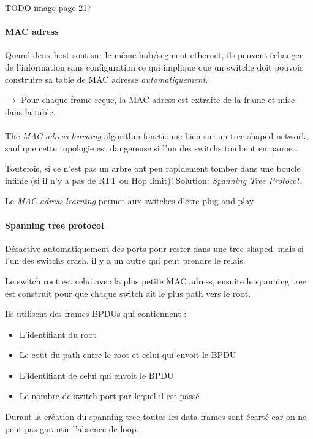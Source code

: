 TODO image page 217

\paragraph{MAC adress}
Quand deux host sont sur le même hub/segment ethernet, ils peuvent échanger de
l'information sans configuration ce qui implique que un switche doit pouvoir
construire sa table de MAC adresse \textit{automatiquement}.

$\rightarrow$ Pour chaque frame reçue, la MAC adress est extraite de la frame et mise dans la table.

\paragraph{ }
The \textit{MAC adress learning} algorithm fonctionne bien sur un tree-shaped network,
sauf que cette topologie est dangereuse si l'un des switchs tombent en panne\ldots

Toutefois, si ce n'est pas un arbre ont peu rapidement tomber dans une boucle infinie
(si il n'y a pas de RTT ou Hop limit)! Solution: \textit{Spanning Tree Protocol}.

Le \textit{MAC adress learning} permet aux switches d'être plug-and-play. 

\paragraph{Spanning tree protocol}
Désactive automatiquement des ports pour rester dans une tree-shaped, mais si l'un des switchs crash, il y a un autre qui peut prendre le relais.

Le switch root est celui avec la plus petite MAC adress, ensuite le spanning tree est construit pour que chaque switch ait le plus path vers le root.

Ils utilisent des frames BPDUs qui contiennent :
\begin{itemize}
    \item L'identifiant du root
    \item Le coût du path entre le root et celui qui envoit le BPDU
    \item L'identifiant de celui qui envoit le BPDU
    \item Le nombre de switch port par lequel il est passé
\end{itemize}

Durant la création du spanning tree toutes les data frames sont écarté car on ne peut pas garantir l'absence de loop.


